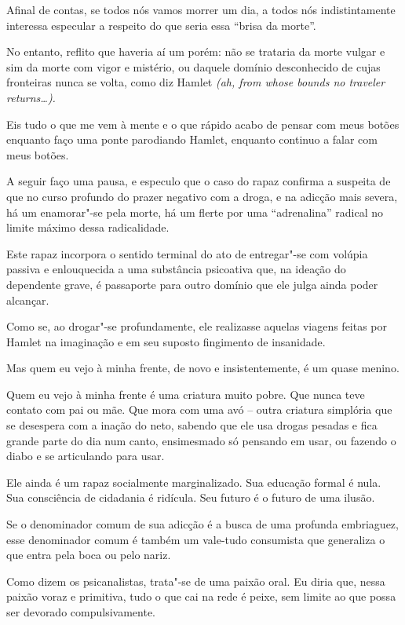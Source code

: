 Afinal de contas, se todos nós vamos morrer um dia, a todos nós
indistintamente interessa especular a respeito do que seria essa ``brisa
da morte''.

No entanto, reflito que haveria aí um porém: não se trataria da morte
vulgar e sim da morte com vigor e mistério, ou daquele domínio
desconhecido de cujas fronteiras nunca se volta, como diz Hamlet
\emph{(ah, from whose bounds no traveler returns…).}

Eis tudo o que me vem à mente e o que rápido acabo de pensar com meus
botões enquanto faço uma ponte parodiando Hamlet, enquanto continuo a
falar com meus botões.

\asterisc{}

A seguir faço uma pausa, e especulo que o caso do rapaz confirma a
suspeita de que no curso profundo do prazer negativo com a droga, e na
adicção mais severa, há um enamorar"-se pela morte, há um flerte por uma
``adrenalina'' radical no limite máximo dessa radicalidade.

Este rapaz incorpora o sentido terminal do ato de entregar"-se com
volúpia passiva e enlouquecida a uma substância psicoativa que, na
ideação do dependente grave, é passaporte para outro domínio que ele
julga ainda poder alcançar.

Como se, ao drogar"-se profundamente, ele realizasse aquelas viagens
feitas por Hamlet na imaginação e em seu suposto fingimento de
insanidade.

\asterisc{}

Mas quem eu vejo à minha frente, de novo e insistentemente, é um quase
menino.

Quem eu vejo à minha frente é uma criatura muito pobre. Que nunca teve
contato com pai ou mãe. Que mora com uma avó -- outra criatura simplória
que se desespera com a inação do neto, sabendo que ele usa drogas
pesadas e fica grande parte do dia num canto, ensimesmado só pensando em
usar, ou fazendo o diabo e se articulando para usar.

Ele ainda é um rapaz socialmente marginalizado. Sua educação formal é
nula. Sua consciência de cidadania é ridícula. Seu futuro é o futuro de
uma ilusão.

Se o denominador comum de sua adicção é a busca de uma profunda
embriaguez, esse denominador comum é também um vale-tudo consumista que
generaliza o que entra pela boca ou pelo nariz.

Como dizem os psicanalistas, trata"-se de uma paixão oral. Eu diria que,
nessa paixão voraz e primitiva, tudo o que cai na rede é peixe, sem
limite ao que possa ser devorado compulsivamente.

